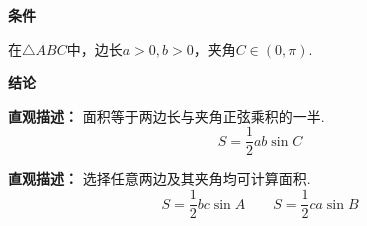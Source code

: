 \begin{statementbox}
	\textbf{\textcolor{CStatement}{条件}}
	\begin{description}[style=nextline, leftmargin=2.8em, labelsep=0.5em, itemsep=0.35em]
		\item[\textbf{\textcolor{CStatement}{条件1（两边及夹角）：}}] 在$\triangle ABC$中，边长$a>0,b>0$，夹角$C\in(0,\pi)$.
	\end{description}

	\textbf{\textcolor{CStatement}{结论}}
	\begin{description}[style=nextline, leftmargin=2.8em, labelsep=0.5em, itemsep=0.45em]
		\item[\textbf{\textcolor{CStatement}{结论一（两边夹角面积）：}}]
			\textbf{\textcolor{CStatement}{直观描述：}}
			面积等于两边长与夹角正弦乘积的一半.
			\[
				\boxed{S=\frac{1}{2}ab\sin C}
			\]

		\item[\textbf{\textcolor{CStatement}{推广结论（其他夹角形式）：}}]
			\textbf{\textcolor{CStatement}{直观描述：}}
			选择任意两边及其夹角均可计算面积.
			\[
				\boxed{S=\frac{1}{2}bc\sin A}
				\qquad
				\boxed{S=\frac{1}{2}ca\sin B}
			\]
	\end{description}

\end{statementbox}
